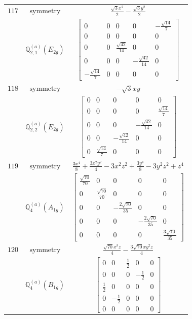 \documentclass[fleqn,8pt,landscape]{jsarticle}
\begin{document}
\begin{longtable}{ccc}
$ 117 $ & $ \text{symmetry} $ & $ \frac{\sqrt{3} x^{2}}{2} - \frac{\sqrt{3} y^{2}}{2} $ \\
$  $ & $ \mathbb{Q}_{2,1}^{(a)}(E_{2g}) $ & $ \begin{bmatrix} 0 & 0 & 0 & 0 & - \frac{\sqrt{14}}{7} \\ 0 & 0 & 0 & 0 & 0 \\ 0 & 0 & \frac{\sqrt{42}}{14} & 0 & 0 \\ 0 & 0 & 0 & - \frac{\sqrt{42}}{14} & 0 \\ - \frac{\sqrt{14}}{7} & 0 & 0 & 0 & 0 \end{bmatrix} $ \\ \hline
$ 118 $ & $ \text{symmetry} $ & $ - \sqrt{3} x y $ \\
$  $ & $ \mathbb{Q}_{2,2}^{(a)}(E_{2g}) $ & $ \begin{bmatrix} 0 & 0 & 0 & 0 & 0 \\ 0 & 0 & 0 & 0 & \frac{\sqrt{14}}{7} \\ 0 & 0 & 0 & - \frac{\sqrt{42}}{14} & 0 \\ 0 & 0 & - \frac{\sqrt{42}}{14} & 0 & 0 \\ 0 & \frac{\sqrt{14}}{7} & 0 & 0 & 0 \end{bmatrix} $ \\ \hline
$ 119 $ & $ \text{symmetry} $ & $ \frac{3 x^{4}}{8} + \frac{3 x^{2} y^{2}}{4} - 3 x^{2} z^{2} + \frac{3 y^{4}}{8} - 3 y^{2} z^{2} + z^{4} $ \\
$  $ & $ \mathbb{Q}_{4}^{(a)}(A_{1g}) $ & $ \begin{bmatrix} \frac{\sqrt{70}}{70} & 0 & 0 & 0 & 0 \\ 0 & \frac{\sqrt{70}}{70} & 0 & 0 & 0 \\ 0 & 0 & - \frac{2 \sqrt{70}}{35} & 0 & 0 \\ 0 & 0 & 0 & - \frac{2 \sqrt{70}}{35} & 0 \\ 0 & 0 & 0 & 0 & \frac{3 \sqrt{70}}{35} \end{bmatrix} $ \\ \hline
$ 120 $ & $ \text{symmetry} $ & $ \frac{\sqrt{70} x^{3} z}{4} - \frac{3 \sqrt{70} x y^{2} z}{4} $ \\
$  $ & $ \mathbb{Q}_{4}^{(a)}(B_{1g}) $ & $ \begin{bmatrix} 0 & 0 & \frac{1}{2} & 0 & 0 \\ 0 & 0 & 0 & - \frac{1}{2} & 0 \\ \frac{1}{2} & 0 & 0 & 0 & 0 \\ 0 & - \frac{1}{2} & 0 & 0 & 0 \\ 0 & 0 & 0 & 0 & 0 \end{bmatrix} $ \\ \hline

\end{longtable}
\end{document}
